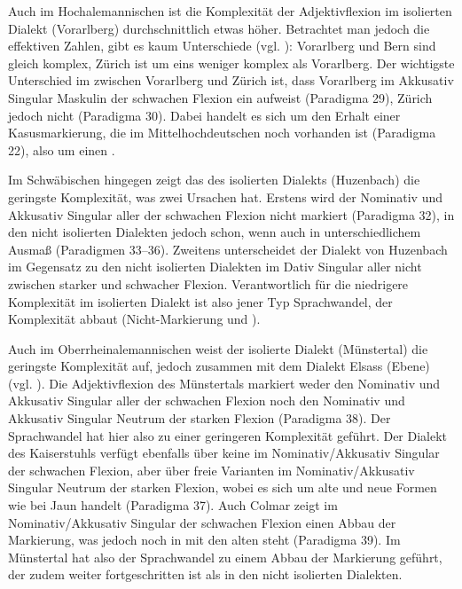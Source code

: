 Auch im Hochalemannischen ist die Komplexität der Adjektivflexion im isolierten Dialekt (Vorarlberg) durchschnittlich etwas höher. Betrachtet man jedoch die effektiven Zahlen, gibt es kaum Unterschiede (vgl. ): Vorarlberg und Bern sind gleich komplex, Zürich ist um eins weniger komplex als Vorarlberg. Der wichtigste Unterschied im  zwischen Vorarlberg und Zürich ist, dass Vorarlberg im Akkusativ Singular Maskulin der schwachen Flexion ein  aufweist (Paradigma 29), Zürich jedoch nicht (Paradigma 30). Dabei handelt es sich um den Erhalt einer Kasusmarkierung, die im Mittelhochdeutschen noch vorhanden ist (Paradigma 22), also um einen .

Im Schwäbischen hingegen zeigt das  des isolierten Dialekts (Huzenbach) die geringste Komplexität, was zwei Ursachen hat. Erstens wird der Nominativ und Akkusativ Singular aller  der schwachen Flexion nicht markiert (Paradigma 32), in den nicht isolierten Dialekten jedoch schon, wenn auch in unterschiedlichem Ausmaß (Paradigmen 33–36). Zweitens unterscheidet der Dialekt von Huzenbach im Gegensatz zu den nicht isolierten Dialekten im Dativ Singular aller  nicht zwischen starker und schwacher Flexion. Verantwortlich für die niedrigere Komplexität im isolierten Dialekt ist also jener Typ Sprachwandel, der Komplexität abbaut (Nicht-Mar\-kie\-rung und ).

Auch im Oberrheinalemannischen weist der isolierte Dialekt (Münstertal) die geringste Komplexität auf, jedoch zusammen mit dem Dialekt Elsass (Ebene) (vgl. ). Die Adjektivflexion des Münstertals markiert weder den Nominativ und Akkusativ Singular aller  der schwachen Flexion noch den Nominativ und Akkusativ Singular Neutrum der starken Flexion (Paradigma 38). Der Sprachwandel hat hier also zu einer geringeren Komplexität geführt. Der Dialekt des Kaiserstuhls verfügt ebenfalls über keine  im Nominativ/Akkusativ Singular der schwachen Flexion, aber über freie Varianten im Nominativ/Akkusativ Singular Neutrum der starken Flexion, wobei es sich um alte und neue Formen wie bei Jaun handelt (Paradigma 37). Auch Colmar zeigt im Nominativ/Akkusativ Singular der schwachen Flexion einen Abbau der Markierung, was jedoch noch in  mit den alten  steht (Paradigma 39). Im Münstertal hat also der Sprachwandel zu einem Abbau der Markierung geführt, der zudem weiter fortgeschritten ist als in den nicht isolierten Dialekten.

